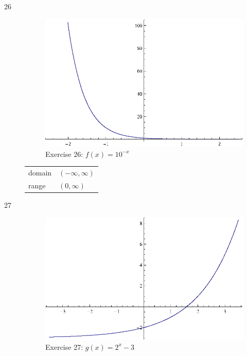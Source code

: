 \documentclass{exam}
\begin{document}
\begin{description}
    \item[26] 
      \begin{figure}[H]
        \centering
        \includegraphics[scale=1.0]{exercise26.eps}
        \caption*{Exercise 26: $f(x) = 10^{-x}$}
      \end{figure}

      \begin{tabular}[H]{ll}
        \toprule
        domain & $(-\infty, \infty)$ \\
        range  & $(0, \infty)$ \\
        \bottomrule
      \end{tabular}

    \item[27] 
      \begin{figure}[H]
        \centering
        \includegraphics[scale=1.0]{exercise27.eps}
        \caption*{Exercise 27: $g(x) = 2^x - 3$}
      \end{figure}


\end{description}
\end{document}
